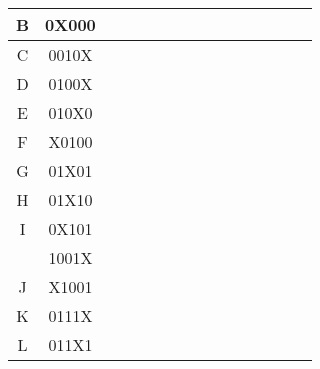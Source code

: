 \documentclass{article}
\begin{document}
\begin{flushleft}
\begin{tabular}{|c|c|r*{12}{|c}|}
    B & 0X000&&\makecell{ }&\makecell{ }&&\makecell{ }&\makecell{ }&\makecell{ }&\makecell{ }&\makecell{ }&\makecell{ }&\makecell{ }&\makecell{ }\\ \hline
    C & 0010X&\makecell{ }&&&\makecell{ }&\makecell{ }&\makecell{ }&\makecell{ }&\makecell{ }&\makecell{ }&\makecell{ }&\makecell{ }&\makecell{ }\\ \hline
    D & 0100X&\makecell{ }&\makecell{ }&\makecell{ }&&&\makecell{ }&\makecell{ }&\makecell{ }&\makecell{ }&\makecell{ }&\makecell{ }&\makecell{ }\\ \hline
    E & 010X0&\makecell{ }&\makecell{ }&\makecell{ }&&\makecell{ }&&\makecell{ }&\makecell{ }&\makecell{ }&\makecell{ }&\makecell{ }&\makecell{ }\\ \hline
    F & X0100&\makecell{ }&&\makecell{ }&\makecell{ }&\makecell{ }&\makecell{ }&\makecell{ }&\makecell{ }&\makecell{ }&\makecell{ }&\makecell{ }&\makecell{ }\\ \hline
    G & 01X01&\makecell{ }&\makecell{ }&\makecell{ }&\makecell{ }&&\makecell{ }&&\makecell{ }&\makecell{ }&\makecell{ }&\makecell{ }&\makecell{ }\\ \hline
    H & 01X10&\makecell{ }&\makecell{ }&\makecell{ }&\makecell{ }&\makecell{ }&&\makecell{ }&&\makecell{ }&\makecell{ }&\makecell{ }&\makecell{ }\\ \hline
    I & 0X101&\makecell{ }&\makecell{ }&&\makecell{ }&\makecell{ }&\makecell{ }&&\makecell{ }&\makecell{ }&\makecell{ }&\makecell{ }&\makecell{ }\\ \hline
    & 1001X&\makecell{ }&\makecell{ }&\makecell{ }&\makecell{ }&\makecell{ }&\makecell{ }&\makecell{ }&\makecell{ }&\makecell{ }&&&\makecell{ }\\ [-1.6ex] \hline\noalign{\vspace{\dimexpr 1.6ex-\doublerulesep}} \hline
    J & X1001&\makecell{ }&\makecell{ }&\makecell{ }&\makecell{ }&&\makecell{ }&\makecell{ }&\makecell{ }&\makecell{ }&\makecell{ }&\makecell{ }&\makecell{ }\\ \hline
    K & 0111X&\makecell{ }&\makecell{ }&\makecell{ }&\makecell{ }&\makecell{ }&\makecell{ }&\makecell{ }&&&\makecell{ }&\makecell{ }&\makecell{ }\\ \hline
    L & 011X1&\makecell{ }&\makecell{ }&\makecell{ }&\makecell{ }&\makecell{ }&\makecell{ }&&\makecell{ }&&\makecell{ }&\makecell{ }&\makecell{ }\\ \hline

\end{tabular}
\end{flushleft}
\end{document}
